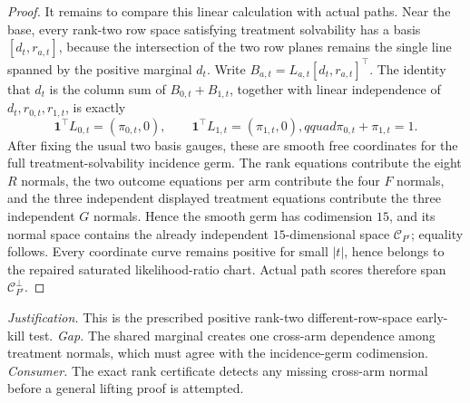 \documentclass{article}
\begin{document}
\begin{proof}
It remains to compare this linear calculation with actual paths.  Near the base, every rank-two row space satisfying treatment solvability has a basis \([d_t,r_{a,t}]\), because the intersection of the two row planes remains the single line spanned by the positive marginal \(d_t\).  Write
\(B_{a,t}=L_{a,t}[d_t,r_{a,t}]^\top\).  The identity that \(d_t\) is the column sum of \(B_{0,t}+B_{1,t}\), together with linear independence of \(d_t,r_{0,t},r_{1,t}\), is exactly
\[
\mathbf1^\top L_{0,t}=(\pi_{0,t},0),\qquad
\mathbf1^\top L_{1,t}=(\pi_{1,t},0),qquad
\pi_{0,t}+\pi_{1,t}=1.
\]
After fixing the usual two basis gauges, these are smooth free coordinates for the full treatment-solvability incidence germ.  The rank equations contribute the eight \(R\) normals, the two outcome equations per arm contribute the four \(F\) normals, and the three independent displayed treatment equations contribute the three independent \(G\) normals.  Hence the smooth germ has codimension \(15\), and its normal space contains the already independent \(15\)-dimensional space \(\mathcal C_{P^\square}\); equality follows.  Every coordinate curve remains positive for small \(|t|\), hence belongs to the repaired saturated likelihood-ratio chart.  Actual path scores therefore span \(\mathcal C_{P^\square}^\perp\).
\end{proof}
\par\smallskip\noindent \textit{Justification.} This is the prescribed positive rank-two different-row-space early-kill test. \textit{Gap.} The shared marginal creates one cross-arm dependence among treatment normals, which must agree with the incidence-germ codimension. \textit{Consumer.} The exact rank certificate detects any missing cross-arm normal before a general lifting proof is attempted.
\end{document}
